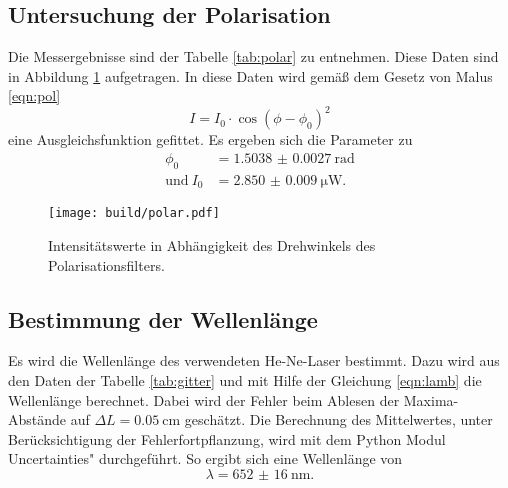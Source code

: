 \subsection{Untersuchung der Polarisation}

Die Messergebnisse sind der Tabelle \ref{tab:polar} zu entnehmen. Diese Daten sind in Abbildung \ref{fig:polar} aufgetragen. In diese Daten wird gemäß dem Gesetz von Malus \eqref{eqn:pol} 
\begin{equation}
    I = I_0 \cdot \cos(\phi - \phi_0)^2
\end{equation}
eine Ausgleichsfunktion gefittet. 
Es ergeben sich die Parameter zu
\begin{align*}
    \phi_0 & = \num{1.5038(27)} \: \text{rad} \\
    \text{und} \: I_0 & = \SI{2.850(9)}{\micro\watt}.
\end{align*}



\begin{figure}
    \centering
    \texttt{[image: build/polar.pdf]}
    \caption{Intensitätswerte in Abhängigkeit des Drehwinkels des Polarisationsfilters.}
    \label{fig:polar}
\end{figure}

\subsection{Bestimmung der Wellenlänge}

Es wird die Wellenlänge des verwendeten He-Ne-Laser bestimmt. Dazu wird aus den Daten der Tabelle \ref{tab:gitter} und mit Hilfe der Gleichung \eqref{eqn:lamb} die Wellenlänge berechnet. Dabei wird der Fehler beim Ablesen der Maxima-Abstände auf $\Delta L = \SI{0.05}{\centi\m}$ geschätzt. Die Berechnung des Mittelwertes, unter Berücksichtigung der Fehlerfortpflanzung, wird mit dem Python Modul \glqq Uncertainties" \cite{uncertainties} durchgeführt.
So ergibt sich eine Wellenlänge von
\begin{equation*}
    \lambda = \SI{652(16)}{\nano\m}.
\end{equation*}

%
